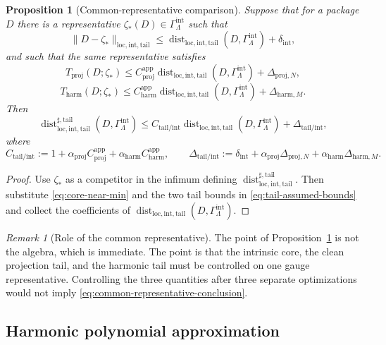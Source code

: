 \documentclass[11pt]{article}
\numberwithin{equation}{section}
\newtheorem{proposition}[proposition]{Proposition}
\theoremstyle{definition}
\theoremstyle{remark}
\newtheorem{remark}[remark]{Remark}
\DeclareMathOperator{\dist}{dist}
\newcommand{\loc}{\mathrm{loc}}
\newcommand{\intg}{\mathrm{int}}
\newcommand{\tail}{\mathrm{tail}}
\newcommand{\proj}{\mathrm{proj}}
\newcommand{\app}{\mathrm{app}}
\newcommand{\harm}{\mathrm{harm}}
\newcommand{\Gammaint}{\Gamma^{\intg}_{\Lambda}}
\begin{document}
\begin{proposition}[Common-representative comparison]\label{prop:common-representative}
Suppose that for a package $D$ there is a representative $\zeta_*(D)\in\Gammaint$ such that
\begin{equation}\label{eq:core-near-min}
\|D-\zeta_*\|_{\loc,\intg,\tail}
\le
\dist_{\loc,\intg,\tail}(D,\Gammaint)+\delta_{\intg},
\end{equation}
and such that the same representative satisfies
\begin{equation}\label{eq:tail-assumed-bounds}
T_{\proj}(D;\zeta_*)
\le
C^{\app}_{\proj}\dist_{\loc,\intg,\tail}(D,\Gammaint)+\Delta_{\proj,N},
\end{equation}
\[
T_{\harm}(D;\zeta_*)
\le
C^{\app}_{\harm}\dist_{\loc,\intg,\tail}(D,\Gammaint)+\Delta_{\harm,M}.
\]
Then
\begin{equation}\label{eq:common-representative-conclusion}
\dist^{\sharp,\tail}_{\loc,\intg,\tail}(D,\Gammaint)
\le
C_{\tail/\intg}\dist_{\loc,\intg,\tail}(D,\Gammaint)+\Delta_{\tail/\intg},
\end{equation}
where
\[
C_{\tail/\intg}:=1+\alpha_{\proj}C^{\app}_{\proj}
+\alpha_{\harm}C^{\app}_{\harm},
\qquad
\Delta_{\tail/\intg}:=\delta_{\intg}
+\alpha_{\proj}\Delta_{\proj,N}+\alpha_{\harm}\Delta_{\harm,M}.
\]
\end{proposition}

\begin{proof}
Use $\zeta_*$ as a competitor in the infimum defining
$\dist^{\sharp,\tail}_{\loc,\intg,\tail}$.  Then substitute
\eqref{eq:core-near-min} and the two tail bounds in \eqref{eq:tail-assumed-bounds} and
collect the coefficients of $\dist_{\loc,\intg,\tail}(D,\Gammaint)$.
\end{proof}

\begin{remark}[Role of the common representative]
The point of Proposition~\ref{prop:common-representative} is not the algebra, which is immediate.
The point is that the intrinsic core, the clean projection tail, and the harmonic tail must
be controlled on one gauge representative.  Controlling the three quantities after three
separate optimizations would not imply \eqref{eq:common-representative-conclusion}.
\end{remark}

\subsection{Harmonic polynomial approximation}
\label{sec:harmonic-approximation}
\end{document}
